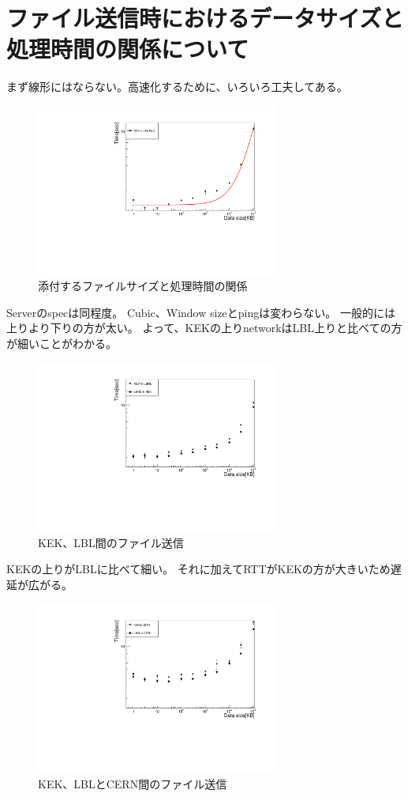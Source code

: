 \chapter{ファイル送信時におけるデータサイズと処理時間の関係について}

まず線形にはならない。高速化するために、いろいろ工夫してある。

\begin{figure}[bpt]\centering
  \begin{center}
    \includegraphics[width=8cm,angle=270]{datasize_vs_time_scp.pdf}
  \caption[添付するファイルサイズと処理時間の関係]{添付するファイルサイズと処理時間の関係}
  \label{datasize_vs_time_scp}
  \end{center}
\end{figure}


Serverのspecは同程度。
Cubic、Window sizeとpingは変わらない。
一般的には上りより下りの方が太い。
よって、KEKの上りnetworkはLBL上りと比べての方が細いことがわかる。
\begin{figure}[bpt]\centering
  \begin{center}
    \includegraphics[width=8cm,angle=270]{scp_kek_lbl.pdf}
  \caption[KEK、LBL間のファイル送信]{KEK、LBL間のファイル送信}
  \label{datasize_vs_time}
  \end{center}
\end{figure}

KEKの上りがLBLに比べて細い。
それに加えてRTTがKEKの方が大きいため遅延が広がる。
\begin{figure}[bpt]\centering
  \begin{center}
    \includegraphics[width=8cm,angle=270]{scp_to_cern.pdf}
  \caption[KEK、LBLとCERN間のファイル送信]{KEK、LBLとCERN間のファイル送信}
  \label{datasize_vs_time}
  \end{center}
\end{figure}


